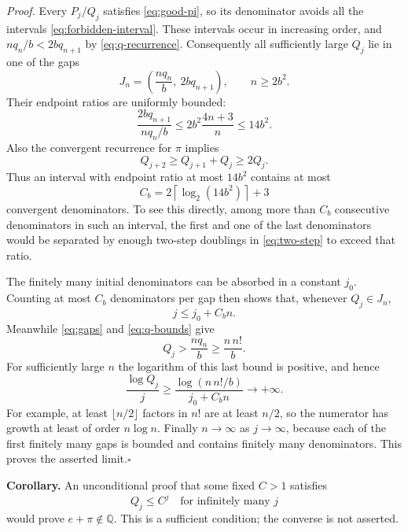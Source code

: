 \documentclass[11pt]{article}
\newcommand{\Q}{\mathbb Q}
\begin{document}
\emph{Proof.} Every $P_j/Q_j$ satisfies \eqref{eq:good-pi}, so its
denominator avoids all the intervals \eqref{eq:forbidden-interval}.
These intervals occur in increasing order, and
$nq_n/b<2bq_{n+1}$ by \eqref{eq:q-recurrence}. Consequently all sufficiently
large $Q_j$ lie in one of the gaps
\begin{equation}\label{eq:gaps}
 J_n=\left(\frac{nq_n}{b},\ 2bq_{n+1}\right),\qquad n\ge2b^2.
\end{equation}
Their endpoint ratios are uniformly bounded:
\begin{equation}\label{eq:gap-ratio}
 \frac{2bq_{n+1}}{nq_n/b}
 \le2b^2\frac{4n+3}{n}\le14b^2.
\end{equation}
Also the convergent recurrence for $\pi$ implies
\begin{equation}\label{eq:two-step}
 Q_{j+2}\ge Q_{j+1}+Q_j\ge2Q_j.
\end{equation}
Thus an interval with endpoint ratio at most $14b^2$ contains at most
\[
 C_b=2\left\lceil\log_2(14b^2)\right\rceil+3
\]
convergent denominators. To see this directly, among more than $C_b$
consecutive denominators in such an interval, the first and one of the
last denominators would be separated by enough two-step doublings in
\eqref{eq:two-step} to exceed that ratio.

The finitely many initial denominators can be absorbed in a constant
$j_0$. Counting at most $C_b$ denominators per gap then shows that, whenever
$Q_j\in J_n$,
\begin{equation}\label{eq:index-bound}
 j\le j_0+C_bn.
\end{equation}
Meanwhile \eqref{eq:gaps} and \eqref{eq:q-bounds} give
\[
 Q_j>\frac{nq_n}{b}\ge\frac{n\,n!}{b}.
\]
For sufficiently large $n$ the logarithm of this last bound is positive,
and hence
\begin{equation}\label{eq:growth-ratio}
 \frac{\log Q_j}{j}
 \ge\frac{\log(n\,n!/b)}{j_0+C_bn}\longrightarrow+\infty.
\end{equation}
For example, at least $\lfloor n/2\rfloor$ factors in $n!$ are at least
$n/2$, so the numerator has growth at least of order $n\log n$.
Finally $n\to\infty$ as $j\to\infty$, because each of the first finitely
many gaps is bounded and contains finitely many denominators. This proves
the asserted limit.\hfill$\square$

\textbf{Corollary.} An unconditional proof that some fixed $C>1$ satisfies
\begin{equation}\label{eq:missing-growth}
 Q_j\le C^j\quad\text{for infinitely many }j
\end{equation}
would prove $e+\pi\notin\Q$.
This is a sufficient condition; the converse is not asserted.
\end{document}
